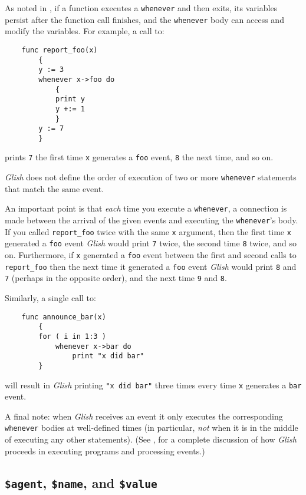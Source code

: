 As noted in , if a function executes a {\tt whenever}
and then exits, its variables persist after the function call finishes,
and the {\tt whenever} body can access and modify the variables.  For
example, a call to:
\begin{verbatim}
    func report_foo(x)
        {
        y := 3
        whenever x->foo do
            {
            print y
            y +:= 1
            }
        y := 7
        }
\end{verbatim}
prints {\tt 7} the first time {\tt x} generates a {\tt foo} event,
{\tt 8} the next time, and so on.

{\em Glish} does not define the order of execution of two or more {\tt whenever}
statements that match the same event.

An important point is that {\em each} time you execute a {\tt whenever},
a connection is made between the arrival of the given events and executing
the {\tt whenever}'s body.  If you called {\tt report\_foo} twice with
the same {\tt x} argument, then the first time {\tt x} 
generated a {\tt foo}
event {\em Glish} would print {\tt 7} twice, the second time {\tt 8} twice,
and so on.  Furthermore, if {\tt x} generated a {\tt foo} event between
the first and second calls to {\tt report\_foo} then the next time it
generated a {\tt foo} event {\em Glish} would print {\tt 8} and {\tt 7} (perhaps
in the opposite order), and the next time {\tt 9} and {\tt 8}.

Similarly, a single call to:
\begin{verbatim}
    func announce_bar(x)
        {
        for ( i in 1:3 )
            whenever x->bar do
                print "x did bar"
        }
\end{verbatim}
will result in {\em Glish} printing {\tt "x did bar"} three times every time
{\tt x} generates a {\tt bar} event.

A final note: when {\em Glish} receives an event it
only executes the corresponding {\tt whenever} bodies at well-defined
times (in particular, {\em not} when it is in the middle of executing
any other statements).  (See , for a complete
discussion of how {\em Glish} proceeds in executing programs and processing
events.)

\subsection{{\tt \$agent}, {\tt \$name}, and {\tt \$value}}
\label{event-vars}

